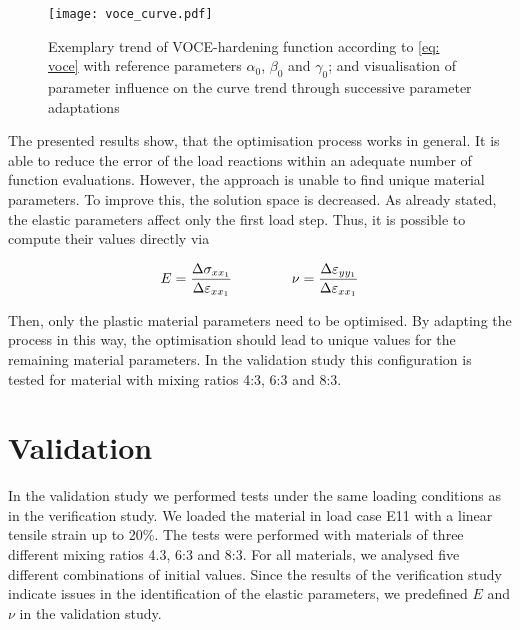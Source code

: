 \begin{figure}[H]
    \centering
    \texttt{[image: voce\_curve.pdf]}
    \caption{Exemplary trend of VOCE-hardening function according to \autoref{eq: voce} with reference parameters $\alpha_0$, $\beta_0$ and $\gamma_0$; and visualisation of parameter influence on the curve trend through successive parameter adaptations}
    \label{fig:voceCurve}
\end{figure}

The presented results show, that the optimisation process works in general. It is able to reduce the error of the load reactions within an adequate number of function evaluations. However, the approach is unable to find unique material parameters. To improve this, the solution space is decreased. As already stated, the elastic parameters affect only the first load step. Thus, it is possible to compute their values directly via

\begin{gather}\label{eq: EandNu}
    E = \frac{\Delta\sigma_{xx_1}}{\Delta\varepsilon_{xx_1}} \hspace{1.5cm}
    \nu = \frac{\Delta\varepsilon_{yy_1}}{\Delta\varepsilon_{xx_1}}
\end{gather}
    
Then, only the plastic material parameters need to be optimised. By adapting the process in this way, the optimisation should lead to unique values for the remaining material parameters. In the validation study this configuration is tested for material with mixing ratios 4:3, 6:3 and 8:3. \\


\newpage
\section{Validation}\label{sec: validation}
In the validation study we performed tests under the same loading conditions as in the verification study.
We loaded the material in load case E11 with a linear tensile strain up to 20\%.
The tests were performed with materials of three different mixing ratios 4.3, 6:3 and 8:3. 
For all materials, we analysed five different combinations of initial values.
Since the results of the verification study indicate issues in the identification of the elastic parameters, we predefined $E$ and $\nu$ in the validation study. 

